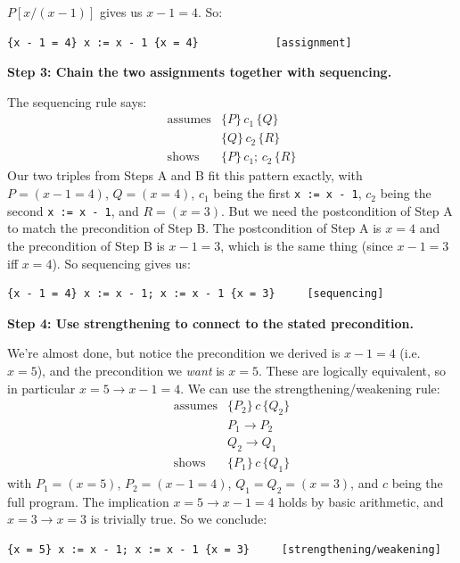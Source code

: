 \documentclass[11pt]{article}
\begin{document}
$P[x/(x-1)]$ gives us $x - 1 = 4$. So:
\begin{lstlisting}
{x - 1 = 4} x := x - 1 {x = 4}            [assignment]
\end{lstlisting}

\medskip
\noindent\textbf{Step 3: Chain the two assignments together with sequencing.}

The sequencing rule says:
\[
  \begin{array}{rl}
    \text{assumes} & \{P\}\, c_1\, \{Q\} \\
                   & \{Q\}\, c_2\, \{R\} \\
    \hline
    \text{shows} & \{P\}\, c_1;\, c_2\, \{R\}
  \end{array}
\]
Our two triples from Steps A and B fit this pattern exactly, with $P = (x - 1 = 4)$, $Q = (x = 4)$, $c_1$ being the first \texttt{x := x - 1}, $c_2$ being the second \texttt{x := x - 1}, and $R = (x = 3)$. But we need the postcondition of Step A to match the precondition of Step B. The postcondition of Step A is $x = 4$ and the precondition of Step B is $x - 1 = 3$, which is the same thing (since $x - 1 = 3$ iff $x = 4$). So sequencing gives us:

\begin{lstlisting}
{x - 1 = 4} x := x - 1; x := x - 1 {x = 3}     [sequencing]
\end{lstlisting}

\medskip
\noindent\textbf{Step 4: Use strengthening to connect to the stated precondition.}

We're almost done, but notice the precondition we derived is $x - 1 = 4$ (i.e.\ $x = 5$), and the precondition we \emph{want} is $x = 5$. These are logically equivalent, so in particular $x = 5 \to x - 1 = 4$. We can use the strengthening/weakening rule:
\[
  \begin{array}{rl}
    \text{assumes} & \{P_2\}\, c\, \{Q_2\} \\
                   & P_1 \to P_2 \\
                   & Q_2 \to Q_1 \\
    \hline
    \text{shows} & \{P_1\}\, c\, \{Q_1\}
  \end{array}
\]
with $P_1 = (x = 5)$, $P_2 = (x - 1 = 4)$, $Q_1 = Q_2 = (x = 3)$, and $c$ being the full program. The implication $x = 5 \to x - 1 = 4$ holds by basic arithmetic, and $x = 3 \to x = 3$ is trivially true. So we conclude:

\begin{lstlisting}
{x = 5} x := x - 1; x := x - 1 {x = 3}     [strengthening/weakening]
\end{lstlisting}
\end{document}
